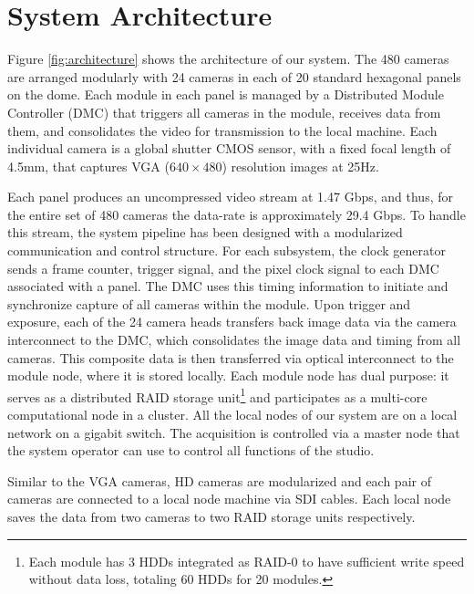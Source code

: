 \section{System Architecture}
Figure \ref{fig:architecture} shows the architecture of our system. The 480 cameras are arranged modularly with 24 cameras in each of 20 standard hexagonal panels on the dome. Each module in each panel is managed by a Distributed Module Controller (DMC) that triggers all cameras in the module, receives data from them, and consolidates the video for transmission to the local machine. Each individual camera is a global shutter CMOS sensor, with a fixed focal length of 4.5mm, that captures VGA ($640\times480$) resolution images at 25Hz. 

Each panel produces an uncompressed video stream at 1.47 Gbps, and thus, for the entire set of 480 cameras the data-rate is approximately 29.4 Gbps. To handle this stream, the system pipeline has been designed with a modularized communication and control structure. For each subsystem, the clock generator sends a frame counter, trigger signal, and the pixel clock signal to each DMC associated with a panel. The DMC uses this timing information to initiate and synchronize capture of all cameras within the module. Upon trigger and exposure, each of the 24 camera heads transfers back image data via the camera interconnect to the DMC, which consolidates the image data and timing from all cameras. This composite data is then transferred via optical interconnect to the module node, where it is stored locally. Each module node has dual purpose: it serves as a distributed RAID storage unit\footnote{Each module has 3 HDDs integrated as RAID-0 to have sufficient write speed without data loss, totaling 60 HDDs for 20 modules.} and participates as a multi-core computational node in a cluster. All the local nodes of our system are on a local network on a gigabit switch. The acquisition is controlled via a master node that the system operator can use to control all functions of the studio.

Similar to the VGA cameras, HD cameras are modularized and each pair of cameras are connected to a local node machine via SDI cables. Each local node saves the data from two cameras to two RAID storage units respectively.

